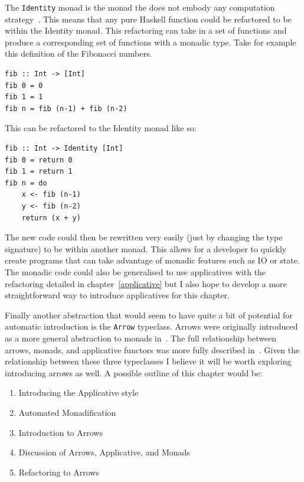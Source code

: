 The \texttt{Identity} monad is the monad the does not embody any computation strategy~\citep{identityMonad}. This means that any pure Haskell function could be refactored to be within the Identity monad. This refactoring can take in a set of functions and produce a corresponding set of functions with a monadic type. Take for example this definition of the Fibonacci numbers.

\begin{lstlisting}[frame=tblr]
fib :: Int -> [Int]
fib 0 = 0
fib 1 = 1
fib n = fib (n-1) + fib (n-2)
\end{lstlisting} 

This can be refactored to the Identity monad like so:\pagebreak

\begin{lstlisting}[frame=tblr]
fib :: Int -> Identity [Int]
fib 0 = return 0
fib 1 = return 1
fib n = do
	x <- fib (n-1)
	y <- fib (n-2)
	return (x + y)
\end{lstlisting}

The new code could then be rewritten very easily (just by changing the type signature) to be within another monad. This allows for a developer to quickly create programs that can take advantage of monadic features such as IO or state. The monadic code could also be generalised to use applicatives with the refactoring detailed in chapter~\ref{applicative} but I also hope to develop a more straightforward way to introduce applicatives for this chapter.

Finally another abstraction that would seem to have quite a bit of potential for automatic introduction is the \texttt{Arrow} typeclass. Arrows were originally introduced as a more general abstraction to monads in~\cite{genMonadsArrows}. The full relationship between arrows, monads, and applicative functors was more fully described in~\cite{arrowsAndIdioms}. Given the relationship between these three typeclasses I believe it will be worth exploring introducing arrows as well. A possible outline of this chapter would be:

\begin{enumerate}
\item Introducing the Applicative style
\item Automated Monadification
\item Introduction to Arrows
\item Discussion of Arrows, Applicative, and Monads
\item Refactoring to Arrows
\end{enumerate} 

